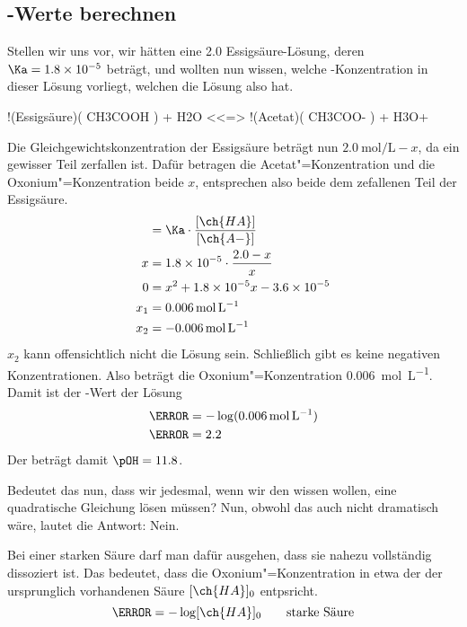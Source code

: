 \documentclass{scrartcl}
\begin{document}
\subsection{\pH-Werte berechnen}
Stellen wir uns vor, wir hätten eine \SI{2.0}{\Molar} Essigsäure-Lösung, deren
$\Ka = \num{1.8e-5}$ beträgt, und wollten nun wissen, welche
-Konzentration in dieser Lösung vorliegt, welchen \pH{} die Lösung also
hat.
\begin{reaction}
  !(Essigsäure)( CH3COOH ) + H2O <<=> !(Acetat)( CH3COO- ) + H3O+
\end{reaction}
Die Gleichgewichtskonzentration der Essigsäure beträgt nun
\(\SI{2.0}{\mole\per\liter}-x\), da ein gewisser Teil zerfallen ist.  Dafür
betragen die Acetat"=Konzentration und die Oxonium"=Konzentration beide \(x\),
entsprechen also beide dem zefallenen Teil der Essigsäure.
\begin{align*}
  [\ch{H3O+}] &= \Ka \cdot \frac{ [\ch{HA}] }{ [\ch{A-}] } \\
  x   &= \num{1.8e-5} \cdot \frac{ 2.0 - x }{ x } \\
  0   &= x^2 +\num{1.8e-5}x - \num{3.6e-5} \\
  x_1 &= \SI{0.006}{\mole\per\liter} \\
  x_2 &= \SI{-0.006}{\mole\per\liter}
\end{align*}
\(x_2\) kann offensichtlich nicht die Lösung sein.  Schließlich gibt es keine
negativen Konzentrationen.  Also beträgt die Oxonium"=Konzentration
\SI{0.006}{\mole\per\liter}.  Damit ist der \pH-Wert der Lösung
\begin{align*}
  \pH &= -\log(\SI{0.006}{\mole\per\liter}) \\
  \pH &= \num{2.2}
\end{align*}
Der \pOH{} beträgt damit \(\pOH = \num{11.8}\).

Bedeutet das nun, dass wir jedesmal, wenn wir den \pH wissen wollen, eine
quadratische Gleichung lösen müssen?  Nun, obwohl das auch nicht dramatisch
wäre, lautet die Antwort: Nein.

Bei einer starken Säure darf man dafür ausgehen, dass sie nahezu vollständig
dissoziert ist.  Das bedeutet, dass die Oxonium"=Konzentration in etwa der der
ursprunglich vorhandenen Säure \([\ch{HA}]_0\) entpsricht.
\begin{equation}
  \pH = -\log[\ch{HA}]_0 \qquad \text{starke Säure}
\end{equation}
\end{document}
